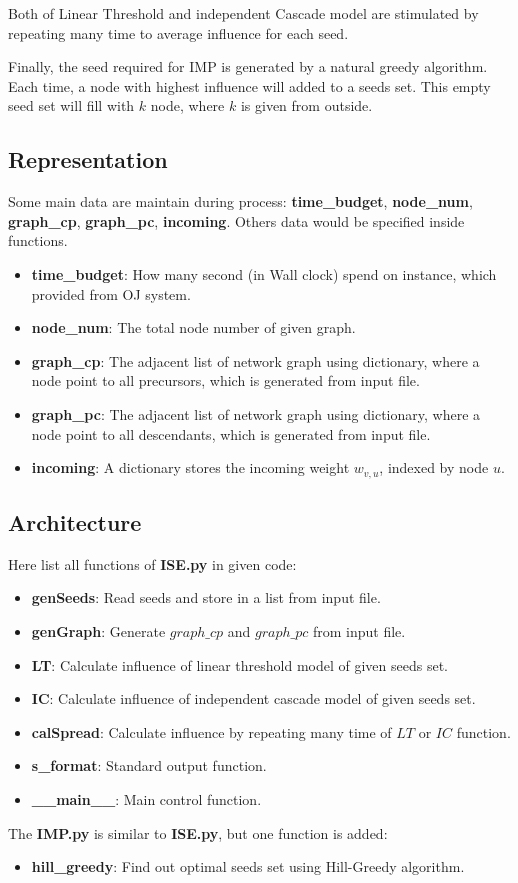 \documentclass[conference,compsoc]{IEEEtran}
\begin{document}
Both of Linear Threshold and independent Cascade model are stimulated by
repeating many time to average influence for each seed.

Finally, the seed required for IMP is generated by a natural greedy algorithm.
Each time, a node with highest influence will added to a seeds set. This empty
seed set will fill with $k$ node, where $k$ is given from outside.

\subsection{Representation}
Some main data are maintain during process: \textbf{time\_budget},
\textbf{node\_num}, \textbf{graph\_cp}, \textbf{graph\_pc}, \textbf{incoming}.
Others data would be specified inside functions.

\begin{itemize}
  \item \textbf{time\_budget}: How many second (in Wall clock) spend on instance,
	  which provided from OJ system.
  \item \textbf{node\_num}: The total node number of given graph.
  \item \textbf{graph\_cp}: The adjacent list of network graph using dictionary,
	  where a node point to all precursors, which is generated from input file.
  \item \textbf{graph\_pc}: The adjacent list of network graph using dictionary,
	  where a node point to all descendants, which is generated from input
		file.
  \item \textbf{incoming}: A dictionary stores the incoming weight $w_{v,u}$,
	  indexed by node $u$.
\end{itemize}


\subsection{Architecture}
Here list all functions of \textbf{ISE.py} in given code:
\begin{itemize}
    \item \textbf{genSeeds}: Read seeds and store in a list from input file.
    \item \textbf{genGraph}: Generate $graph\_cp$ and $graph\_pc$ from input file.
    \item \textbf{LT}: Calculate influence of linear threshold model of given seeds
	    set.
    \item \textbf{IC}: Calculate influence of independent cascade model of given
	    seeds set.
    \item \textbf{calSpread}: Calculate influence by repeating many time of $LT$
	    or $IC$ function.
    \item \textbf{s\_format}: Standard output function. 
    \item \textbf{\_\_main\_\_}: Main control function. 
\end{itemize}
The \textbf{IMP.py} is similar to \textbf{ISE.py}, but one function is added:
\begin{itemize}
    \item \textbf{hill\_greedy}: Find out optimal seeds set using Hill-Greedy
	    algorithm.
\end{itemize}
\end{document}
